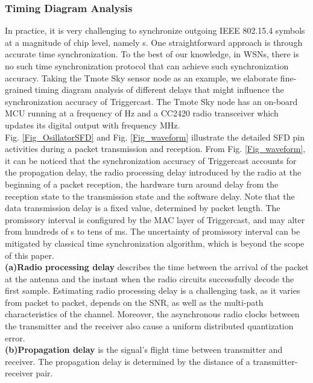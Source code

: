 \documentclass[conference]{IEEEtran}
\begin{document}
\subsubsection{Timing Diagram Analysis}
\label{Sec_TimingAnalysis}
\indent In practice, it is very challenging to synchronize outgoing IEEE 802.15.4 symbols at a magnitude of chip level, namely s.
One straightforward approach is through accurate time synchronization.
To the best of our knowledge, in WSNs, there is no such time synchronization protocol \cite{MarotiSensys2004FTSP} that can achieve such synchronization accuracy.
Taking the Tmote Sky sensor node as an example, we elaborate fine-grained timing diagram analysis of different delays that might influence the synchronization accuracy of Triggercast.
The Tmote Sky node has an on-board MCU running at a frequency of Hz and a CC2420 radio transceiver which updates its digital output with frequency MHz.\\
\indent  Fig. \ref{Fig_OsillatorSFD} and Fig. \ref{Fig_waveform} illustrate the detailed SFD pin activities during a packet transmission and reception.
From Fig. \ref{Fig_waveform}, it can be noticed that the synchronization accuracy of Triggercast accounts for the propagation delay, the radio processing delay introduced by the radio at the beginning of a packet reception, the hardware turn around delay from the reception state to the transmission state and the software delay. Note that the data transmission delay is a fixed value, determined by packet length. The promissory interval is configured by the MAC layer of Triggercast, and may alter from hundreds of s to tens of ms. The uncertainty of promissory interval can be mitigated by classical time synchronization algorithm, which is beyond the scope of this paper.\\
\indent \textbf{(a)Radio processing delay} describes the time between the arrival of the packet at the antenna and the instant when the radio circuits successfully decode the first sample.
Estimating radio processing delay is a challenging task, as it varies from packet to packet, depends on the SNR, as well as the multi-path characteristics of the channel.
Moreover, the asynchronous radio clocks between the transmitter and the receiver also cause a uniform distributed quantization error.\\
\indent \textbf{(b)Propagation delay} is the signal's flight time between transmitter and receiver.
The propagation delay is determined by the distance of a transmitter-receiver pair.\\
\end{document}
